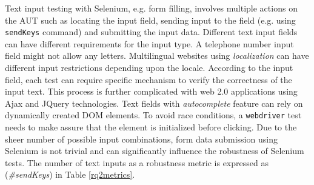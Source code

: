 Text input testing with Selenium, e.g. form filling, involves multiple actions on the AUT such as locating the input field, sending input to the field (e.g. using \texttt{sendKeys} command) and submitting the input data. Different text input fields can have different requirements for the input type. A telephone number input field might not allow any letters. Multilingual websites using \textit{localization} can have different input restrictions depending upon the locale. According to the input field, each test can require specific mechanism to verify the correctness of the input text. This process is further complicated with web 2.0 applications using Ajax and JQuery technologies. Text fields with \textit{autocomplete} feature can rely on dynamically created DOM elements. To avoid race conditions, a \texttt{webdriver} test needs to make assure that the element is initialized before clicking. Due to the sheer number of possible input combinations, form data submission using Selenium is not trivial and can significantly influence the robustness of Selenium tests. The number of text inputs as a robustness metric is expressed as (\textit{\#sendKeys}) in Table \ref{rq2metrics}. 
